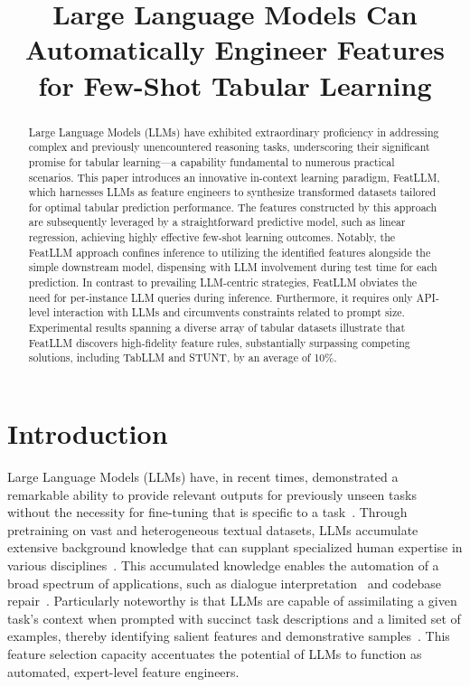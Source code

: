 \title{Large Language Models Can Automatically Engineer Features for Few-Shot Tabular Learning}

\begin{abstract}
Large Language Models (LLMs) have exhibited extraordinary proficiency in addressing complex and previously unencountered reasoning tasks, underscoring their significant promise for tabular learning—a capability fundamental to numerous practical scenarios. This paper introduces an innovative in-context learning paradigm, \textsf{FeatLLM}, which harnesses LLMs as feature engineers to synthesize transformed datasets tailored for optimal tabular prediction performance. The features constructed by this approach are subsequently leveraged by a straightforward predictive model, such as linear regression, achieving highly effective few-shot learning outcomes. Notably, the \textsf{FeatLLM} approach confines inference to utilizing the identified features alongside the simple downstream model, dispensing with LLM involvement during test time for each prediction. In contrast to prevailing LLM-centric strategies, \textsf{FeatLLM} obviates the need for per-instance LLM queries during inference. Furthermore, it requires only API-level interaction with LLMs and circumvents constraints related to prompt size. Experimental results spanning a diverse array of tabular datasets illustrate that \textsf{FeatLLM} discovers high-fidelity feature rules, substantially surpassing competing solutions, including TabLLM and STUNT, by an average of 10\%.
\end{abstract}

\section{Introduction}
Large Language Models (LLMs) have, in recent times, demonstrated a remarkable ability to provide relevant outputs for previously unseen tasks without the necessity for fine-tuning that is specific to a task~\cite{creswell2022selection,imani2023mathprompter,taylor2022galactica}. Through pretraining on vast and heterogeneous textual datasets, LLMs accumulate extensive background knowledge that can supplant specialized human expertise in various disciplines~\cite{Genomes2021,singhal2023large,wilcox2003role}. This accumulated knowledge enables the automation of a broad spectrum of applications, such as dialogue interpretation~\cite{finch2023leveraging} and codebase repair~\cite{fan2023automated}. Particularly noteworthy is that LLMs are capable of assimilating a given task’s context when prompted with succinct task descriptions and a limited set of examples, thereby identifying salient features and demonstrative samples~\cite{brown2020language,zhao2023survey}. This feature selection capacity accentuates the potential of LLMs to function as automated, expert-level feature engineers.

